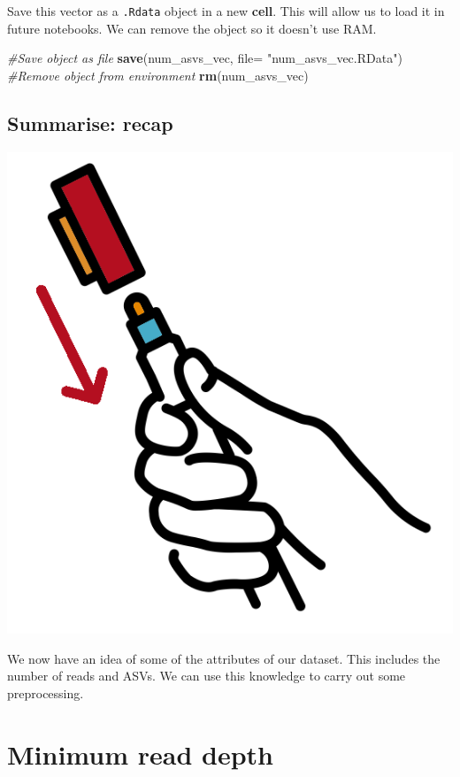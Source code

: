 \documentclass[
]{book}
\newenvironment{Shaded}{\begin{snugshade}}{\end{snugshade}}
\newcommand{\AttributeTok}[1]{\textcolor[rgb]{0.13,0.29,0.53}{#1}}
\newcommand{\CommentTok}[1]{\textcolor[rgb]{0.56,0.35,0.01}{\textit{#1}}}
\newcommand{\FunctionTok}[1]{\textcolor[rgb]{0.13,0.29,0.53}{\textbf{#1}}}
\newcommand{\NormalTok}[1]{#1}
\newcommand{\StringTok}[1]{\textcolor[rgb]{0.31,0.60,0.02}{#1}}
\begin{document}
Save this vector as a \texttt{.Rdata} object in a new \textbf{cell}.
This will allow us to load it in future notebooks.
We can remove the object so it doesn't use RAM.

\begin{Shaded}
\begin{Highlighting}[]
\CommentTok{\#Save object as file}
\FunctionTok{save}\NormalTok{(num\_asvs\_vec, }\AttributeTok{file=} \StringTok{"num\_asvs\_vec.RData"}\NormalTok{)}
\CommentTok{\#Remove object from environment}
\FunctionTok{rm}\NormalTok{(num\_asvs\_vec)}
\end{Highlighting}
\end{Shaded}

\hypertarget{summarise-recap}{%
\section{Summarise: recap}\label{summarise-recap}}

\includegraphics{figures/recap.png}

We now have an idea of some of the attributes of our dataset. This includes the number of reads and ASVs. We can use this knowledge to carry out some preprocessing.

\hypertarget{mindepthchap}{%
\chapter{Minimum read depth}\label{mindepthchap}}
\end{document}
